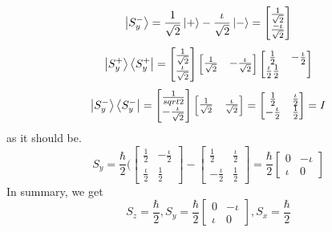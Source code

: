 \documentclass{book}
\begin{document}
$$ \ket{S_y^-} = \frac{1}{\sqrt{2}} \ket{+} - \frac{\iota}{\sqrt{2}} \ket{-} = \begin{bmatrix}
 \frac{1}{\sqrt{2}} \\ \frac{-\iota}{\sqrt{2}}
\end{bmatrix}$$
$$\ket{S_y^+} \bra{S_y^+} = \begin{bmatrix}
 \frac{1}{\sqrt{2}} \\ \frac{\iota}{\sqrt{2}}
\end{bmatrix}
\begin{bmatrix}
 \frac{1}{\sqrt{2}} & - \frac{\iota}{\sqrt{2}}
\end{bmatrix}
\begin{bmatrix}
  \frac{1}{2} & -\frac{\iota}{2} \\
  \frac{\iota}{2} \frac{1}{2}
\end{bmatrix}$$
$$
\ket{S_y^-}\bra{S_y^-} = \begin{bmatrix}
\frac{1}{sqrt{2}} \\ -\frac{\iota}{\sqrt{2}} 
\end{bmatrix}
\begin{bmatrix}
  \frac{1}{\sqrt{2}} & \frac{\iota}{\sqrt{2}}
\end{bmatrix} =
\begin{bmatrix}
  \frac{1}{2} & \frac{\iota}{2} \\
  - \frac{\iota}{2} & \frac{1}{2}
\end{bmatrix} = I
$$
as it should be.
$$ S_y = \frac{\hbar}{2} ( \begin{bmatrix}
  \frac{1}{2} & - \frac{\iota}{2} \\
  \frac{\iota}{2} & \frac{1}{2} 
\end{bmatrix} -
\begin{bmatrix}
  \frac{1}{2} & \frac{\iota}{2} \\ 
  -\frac{\iota}{2} & \frac{1}{2}
\end{bmatrix} = 
\frac{\hbar}{2} \begin{bmatrix}
  0 & -\iota \\
  \iota & 0
\end{bmatrix}
$$
In summary, we get 
$$ S_z = \frac{\hbar}{2}, S_y = \frac{\hbar}{2} \begin{bmatrix}
  0 & -\iota \\
  \iota & 0
\end{bmatrix},
S_x = \frac{\hbar}{2}
$$
\end{document}
